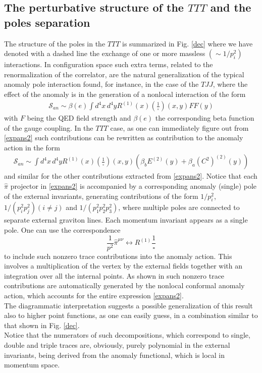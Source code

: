 \documentclass[a4paper,11pt,openright,twoside]{book}
\numberwithin{equation}{section}
\begin{document}
{{\subsection{The perturbative structure of the $TTT$ and the poles separation} 
The structure of the poles in the $TTT$ is summarized in Fig. \ref{dec} where we have denoted with a dashed line the exchange of one or more massless $(\sim 1/p_i^2)$ interactions. In configuration space such extra terms, related to the renormalization of the correlator, are the natural generalization of the typical anomaly pole interaction found, for instance, in the case of the $TJJ$, where the effect of the anomaly is in the generation of a nonlocal interaction of the form \cite{Giannotti:2008cv,Armillis:2009pq,Armillis:2010qk}
\begin{align}
	\mathcal{S}_{an}\sim \beta(e) \int d^4 x\, d^4 y R^{(1)}(x)  \left(\frac{1}{\square}\right)(x,y) F F(y)
\end{align}
with $F$ being the QED field strength and $\beta(e)$ the corresponding beta function of the gauge coupling. In the $TTT$ case, as one can immediately figure out from \eqref{expans2} such contributions can be rewritten as contribution to the anomaly action in the form
\begin{align}
	\mathcal{S}_{an}\sim \int d^4 x\, d^4 y R^{(1)}(x)  \left(\frac{1}{\square}\right)(x,y) \left( \beta_b E^{(2)}(y) + \beta_a (C^2)^{(2)}(y)\right)
\end{align}
and similar for the other contributions extracted from \eqref{expans2}. Notice that each $\hat\pi$ projector in \eqref{expans2} is accompanied by a corresponding anomaly (single) pole of the external invariants, generating contributions of the form $1/p_i^2$,  $1/(p_i^2 p_j^2) (i\neq j)$ and $1/(p_1^2 p_2^2 p_3^2)$, where multiple poles are connected to separate external graviton lines. Each momentum invariant appears as a single pole. One can use the correspondence 
\begin{equation}
	\frac{1}{p^2} \hat\pi^{\mu\nu} \leftrightarrow R^{(1)}\frac{1}{\square} 
\end{equation}
to include such nonzero trace contributions into the anomaly action. This involves a multiplication of the vertex by the external fields together with an integration over all the internal points. As shown in \cite{Coriano:2017mux} such nonzero trace contributions are automatically generated by the nonlocal conformal anomaly action, which accounts for the entire expression \eqref{expans2}. \\
The diagrammatic interpretation suggests a possible generalization of this result also to higher point functions, as one can easily guess, in a combination similar to that shown in Fig. \ref{dec}.\\
Notice that the numerators of such decompositions, which correspond to single, double and triple traces are, obviously, purely polynomial in the external invariants, being derived from the anomaly functional, which is local in momentum space.\\

}}
\end{document}
